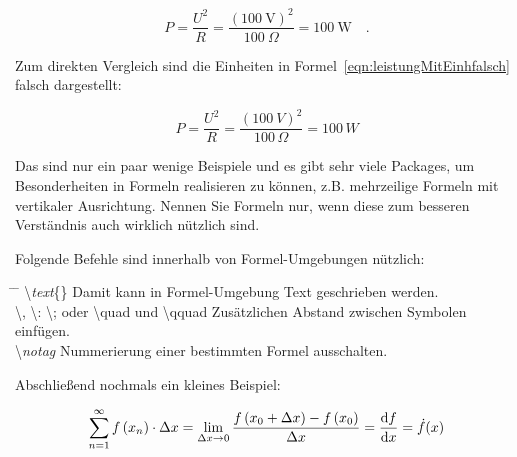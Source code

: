 \begin{equation}
P=\frac{U^2}{R} = \frac{\left( 100~\mathrm{V}\right)^2}{100~\Omega} = 100~\mathrm{W}\quad .
\label{eqn:leistungMitEinh}
\end{equation}

Zum direkten Vergleich sind die Einheiten in Formel~\ref{eqn:leistungMitEinhfalsch} falsch dargestellt:

\begin{equation}
P=\frac{U^2}{R} = \frac{\left( 100~V\right)^2}{100\,\varOmega} = 100\,W
\label{eqn:leistungMitEinhfalsch}
\end{equation}

Das sind nur ein paar wenige Beispiele und es gibt sehr viele Packages, um Besonderheiten in Formeln realisieren zu können, z.B. mehrzeilige Formeln mit vertikaler Ausrichtung. Nennen Sie Formeln nur, wenn diese zum besseren Verständnis auch wirklich nützlich sind.

Folgende Befehle sind innerhalb von Formel-Umgebungen nützlich:
\begin{tabbing}
	\hspace*{0cm} \= \hspace{0.35\linewidth} \= \+\kill
	\textbackslash \textit{text}\{\}	\> Damit kann in Formel-Umgebung Text geschrieben werden.\\ 
	\textbackslash, \textbackslash: \textbackslash; oder \textbackslash quad und \textbackslash qquad \> Zusätzlichen Abstand zwischen Symbolen einfügen.\\
	\textbackslash \textit{notag} \> Nummerierung einer bestimmten Formel ausschalten.
\end{tabbing}

Abschließend nochmals ein kleines Beispiel:

\begin{eqnarray}
\sum\limits_{n=1}^\infty f\left(x_n\right)\cdot \Delta x=  \lim\limits_{\Delta x \rightarrow 0} \frac{f\left(x_0+\Delta x\right)-f\left(x_0\right)}{\Delta x} = \frac{\mathop{}\!\mathrm{d} f}{\mathop{}\!\mathrm{d} x} = \dot{f}(x)
\end{eqnarray}